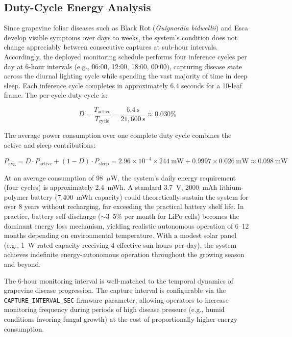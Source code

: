 \subsection{Duty-Cycle Energy Analysis}
\label{subsec:duty_cycle}

Since grapevine foliar diseases such as Black Rot (\textit{Guignardia bidwellii}) and Esca develop visible symptoms over days to weeks, the system's condition does not change appreciably between consecutive captures at sub-hour intervals. Accordingly, the deployed monitoring schedule performs four inference cycles per day at 6-hour intervals (e.g., 06:00, 12:00, 18:00, 00:00), capturing disease state across the diurnal lighting cycle while spending the vast majority of time in deep sleep. Each inference cycle completes in approximately 6.4 seconds for a 10-leaf frame. The per-cycle duty cycle is:

\begin{equation}
D = \frac{T_{\text{active}}}{T_{\text{cycle}}} = \frac{6.4~\text{s}}{21{,}600~\text{s}} \approx 0.030\%
\end{equation}

The average power consumption over one complete duty cycle combines the active and sleep contributions:

\begin{equation}
P_{\text{avg}} = D \cdot P_{\text{active}} + (1 - D) \cdot P_{\text{sleep}} = 2.96 \times 10^{-4} \times 244~\text{mW} + 0.9997 \times 0.026~\text{mW} \approx 0.098~\text{mW}
\label{eq:avg_power}
\end{equation}

At an average consumption of 98~$\mu$W, the system's daily energy requirement (four cycles) is approximately 2.4~mWh. A standard 3.7~V, 2000~mAh lithium-polymer battery (7,400~mWh capacity) could theoretically sustain the system for over 8 years without recharging, far exceeding the practical battery shelf life. In practice, battery self-discharge ($\sim$3--5\% per month for LiPo cells) becomes the dominant energy loss mechanism, yielding realistic autonomous operation of 6--12 months depending on environmental temperature. With a modest solar panel (e.g., 1~W rated capacity receiving 4 effective sun-hours per day), the system achieves indefinite energy-autonomous operation throughout the growing season and beyond.

The 6-hour monitoring interval is well-matched to the temporal dynamics of grapevine disease progression. The capture interval is configurable via the \texttt{CAPTURE\_INTERVAL\_SEC} firmware parameter, allowing operators to increase monitoring frequency during periods of high disease pressure (e.g., humid conditions favoring fungal growth) at the cost of proportionally higher energy consumption.

